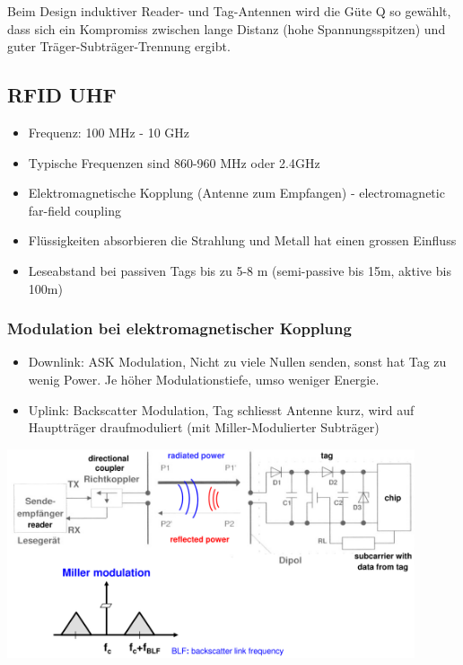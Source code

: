 	Beim Design induktiver Reader- und Tag-Antennen wird die Güte Q so gewählt, dass sich ein Kompromiss zwischen lange Distanz (hohe Spannungsspitzen) 
	und guter Träger-Subträger-Trennung ergibt.
	

\subsection{RFID UHF}
	\begin{itemize}
		\item Frequenz:	100 MHz - 10 GHz
		\item Typische Frequenzen sind 860-960 MHz oder 2.4GHz
		\item Elektromagnetische Kopplung (Antenne zum Empfangen) - electromagnetic far-field coupling
		\item Flüssigkeiten absorbieren die Strahlung und Metall hat einen grossen Einfluss
		\item Leseabstand bei passiven Tags bis zu 5-8 m (semi-passive bis 15m, aktive bis 100m)
		
	\end{itemize}

\subsubsection{Modulation bei elektromagnetischer Kopplung}
	\begin{itemize}
		\item Downlink: ASK Modulation, Nicht zu viele Nullen senden, sonst hat Tag zu wenig Power. Je höher Modulationstiefe, umso weniger Energie. 
		\item Uplink: Backscatter Modulation, Tag schliesst Antenne kurz, wird auf Hauptträger draufmoduliert (mit Miller-Modulierter Subträger)
	\end{itemize}

	\begin{minipage}{12cm}
		\includegraphics[width=12cm]{./bilder/rfid-millermod.png} 
	\end{minipage}
	
